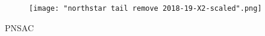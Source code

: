 \begin{figure}[httb]
   \vspace{2em}
   \centering
   \texttt{[image: "northstar tail remove 2018-19-X2-scaled".png]}
   \label{fig:stab-one}
\end{figure}





\begin{footnotesize}
    \raggedleft PNSAC\\
\end{footnotesize}




